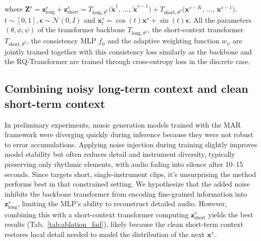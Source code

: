 where $\mathbf{Z}^s = \mathbf{z}_{\text{long}}^s + \mathbf{z}_{\text{short}}^s = T_{\text{long}, \theta^1}\bigl(\tilde{\mathbf{x}}^1,\,\ldots,\,\tilde{\mathbf{x}}^{s-1}\bigr) + T_{\text{short}, \theta^2}\bigl(\mathbf{x}^{s-K},\,\ldots,\,\mathbf{x}^{s-1}\bigr)$, \\
$t\sim[0, 1], \bm{\epsilon} \sim \mathcal{N}(0, I) $ and $\mathbf{x}_t^s = \cos(t)\mathbf{x}^s + \sin(t) \bm{\epsilon}$. All the parameters $(\theta,\phi, \psi)$ of the transformer backbone $T_{\text{long}, \theta^1}$, the short-context transformer $T_{\text{short}, \theta^2}$, the consistency MLP $f_\phi$ and the adaptive weighting function $w_\psi$ are jointly trained together with this consistency loss similarly as the backbone and the RQ-Transformer are trained through cross-entropy loss in the discrete case.



\subsection{Combining noisy long-term context and clean short-term context}

\label{sec:noise}
In preliminary experiments, music generation models trained with the MAR framework were diverging quickly during inference because they were not robust to error accumulations. Applying noise injection during training slightly improves model stability but often reduces detail and instrument diversity, typically preserving only rhythmic elements, with audio fading into silence after 10–15 seconds. Since \citet{sony_trick} targets short, single-instrument clips, it's unsurprising the method performs best in that constrained setting. We hypothesize that the added noise inhibits the backbone transformer from encoding fine-grained information into $\mathbf{z}^s_{\text{long}}$, limiting the MLP’s ability to reconstruct detailed audio. However, combining this with a short-context transformer computing $\mathbf{z}^s_{\text{short}}$ yields the best results (Tab.~\ref{tab:ablation_fad}), likely because the clean short-term context restores local detail needed to model the distribution of the next $\mathbf{x}^s$. 


